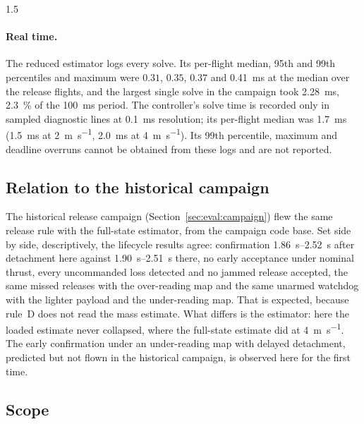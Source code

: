 \begin{spacing}{1.5}
\paragraph{Real time.} The reduced estimator logs every solve. Its per-flight
median, 95th and 99th percentiles and maximum were $0.31$, $0.35$, $0.37$ and
\SI{0.41}{\milli\second} at the median over the release flights,
and the largest single solve in the campaign took \SI{2.28}{\milli\second},
\SI{2.3}{\percent} of the \SI{100}{\milli\second} period. The controller's solve
time is recorded only in sampled diagnostic lines at \SI{0.1}{\milli\second}
resolution; its per-flight median was \SI{1.7}{\milli\second}
(\SI{1.5}{\milli\second} at \SI{2}{\meter\per\second},
\SI{2.0}{\milli\second} at \SI{4}{\meter\per\second}). Its 99th percentile,
maximum and deadline overruns cannot be obtained from these logs and are not
reported.

\subsection{Relation to the historical campaign}\label{sec:eval:dep:history}

The historical release campaign (Section~\ref{sec:eval:campaign}) flew the same
release rule with the full-state estimator, from the campaign code base. Set
side by side, descriptively, the lifecycle results agree: confirmation
\SIrange{1.86}{2.52}{\second} after detachment here against
\SIrange{1.90}{2.51}{\second} there, no early acceptance under nominal thrust,
every uncommanded loss detected and no jammed release accepted, the same
missed releases with the over-reading map and the same unarmed watchdog with the
lighter payload and the under-reading map. That is expected, because rule~D
does not read the mass estimate. What differs is the estimator: here the loaded
estimate never collapsed, where the full-state estimate did at
\SI{4}{\meter\per\second}. The early confirmation under an under-reading map
with delayed detachment, predicted but not flown in the historical campaign, is
observed here for the first time.

\subsection{Scope}\label{sec:eval:dep:scope}


\end{spacing}
